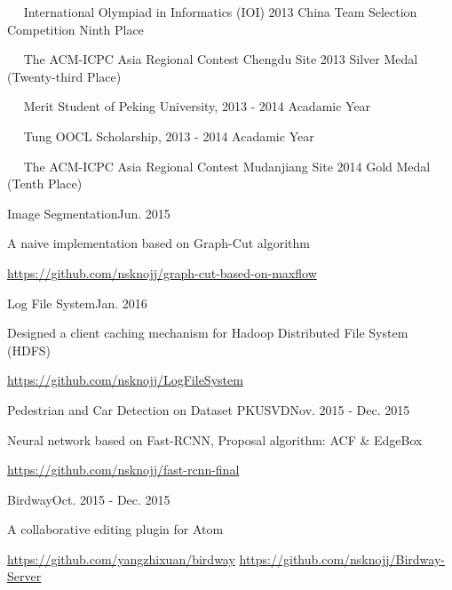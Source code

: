 \documentclass{joel_cv}
\begin{document}
%
%

\begin{description}{}
	\item{\ \ } International Olympiad in Informatics (IOI) 2013 China Team Selection Competition Ninth Place
	\item{\ \ } The ACM-ICPC Asia Regional Contest Chengdu Site 2013 Silver Medal (Twenty-third Place)
	\item{\ \ } Merit Student of Peking University, 2013 - 2014 Acadamic Year
	\item{\ \ } Tung OOCL Scholarship, 2013 - 2014 Acadamic Year
	\item{\ \ } The ACM-ICPC Asia Regional Contest Mudanjiang Site 2014 Gold Medal (Tenth Place)
\end{description}


%
%


\begin{sectionContentSimple}{Image Segmentation}{Jun. 2015}
\item A naive implementation based on Graph-Cut algorithm
\item \url{https://github.com/nsknojj/graph-cut-based-on-maxflow}
\end{sectionContentSimple}

\begin{sectionContentSimple}{Log File System}{Jan. 2016}
\item Designed a client caching mechanism for Hadoop Distributed File System (HDFS)
\item \url{https://github.com/nsknojj/LogFileSystem}
\end{sectionContentSimple}

\begin{sectionContentSimple}{Pedestrian and Car Detection on Dataset PKUSVD}{Nov. 2015 - Dec. 2015}
\item Neural network based on Fast-RCNN, Proposal algorithm: ACF \& EdgeBox
\item \url{https://github.com/nsknojj/fast-rcnn-final}
\end{sectionContentSimple}

\begin{sectionContentSimple}{Birdway}{Oct. 2015 - Dec. 2015}
\item A collaborative editing plugin for Atom
\item \url{https://github.com/yangzhixuan/birdway} \quad \url{https://github.com/nsknojj/Birdway-Server}
\end{sectionContentSimple}
\end{document}
